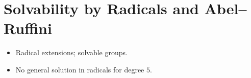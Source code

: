 \section{Solvability by Radicals and Abel--Ruffini}
\begin{itemize}
  \item Radical extensions; solvable groups.
  \item No general solution in radicals for degree $5$.
\end{itemize}

